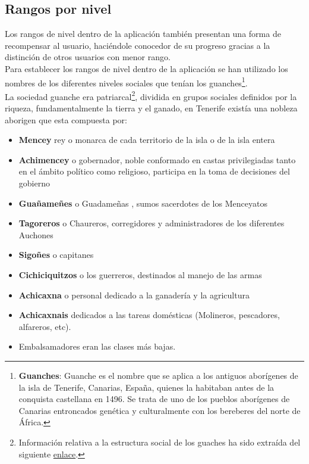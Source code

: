 \documentclass{report}
\begin{document}
\subsection{Rangos por nivel}
Los rangos de nivel dentro de la aplicación también presentan una forma de recompensar al usuario, haciéndole conocedor de su progreso gracias a la distinción de otros usuarios con menor rango.\\
Para establecer los rangos de nivel dentro de la aplicación se han utilizado los nombres de los diferentes niveles sociales que tenían los guanches\footnote{\textbf{Guanches}: Guanche es el nombre que se aplica a los antiguos aborígenes de la isla de Tenerife, Canarias, España, quienes la habitaban antes de la conquista castellana en 1496. Se trata de uno de los pueblos aborígenes de Canarias entroncados genética y culturalmente con los bereberes del norte de África.}.\\

La sociedad guanche era patriarcal\footnote{Información relativa a la estructura social de los guaches ha sido extraída del siguiente \href{http://www.tenerife-guanches.com/sp/sociedad.aspx}{enlace}.}, dividida en grupos sociales definidos por la riqueza, fundamentalmente la tierra y el ganado, en Tenerife existía una nobleza aborigen que esta compuesta por:
\begin{itemize}
\item \textbf{Mencey} rey o monarca de cada territorio de la isla o de la isla entera
\item \textbf{Achimencey} o gobernador, noble conformado en castas privilegiadas tanto en el ámbito político como religioso, participa en la toma de decisiones del gobierno
\item \textbf{Guañameñes} o Guadameñas , sumos sacerdotes de los Menceyatos
\item \textbf{Tagoreros} o Chaureros, corregidores y administradores de los diferentes Auchones
\item \textbf{Sigoñes} o capitanes
\item \textbf{Cichiciquitzos} o los guerreros, destinados al manejo de las armas
\item \textbf{Achicaxna} o personal dedicado a la ganadería y la agricultura
\item \textbf{Achicaxnais} dedicados a las tareas domésticas (Molineros, pescadores, alfareros, etc). 
\item Embalsamadores eran las clases más bajas.
\end{itemize}
\end{document}
